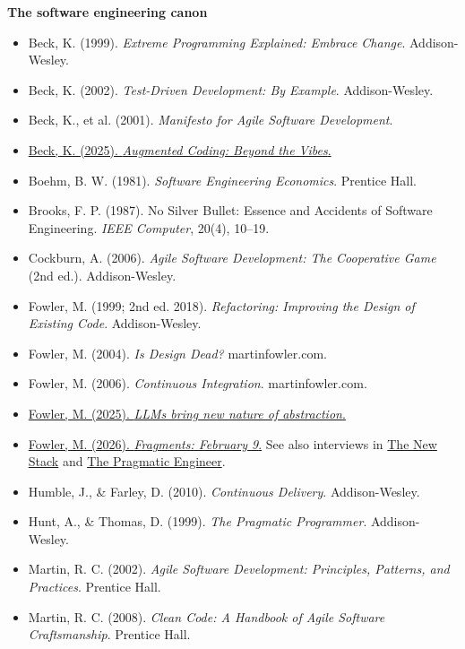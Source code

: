 \documentclass[11pt]{article}
\begin{document}
\textbf{The software engineering canon}
\begin{itemize}[leftmargin=*]
  \item Beck, K. (1999). \emph{Extreme Programming Explained: Embrace Change}. Addison-Wesley.
  \item Beck, K. (2002). \emph{Test-Driven Development: By Example}. Addison-Wesley.
  \item Beck, K., et al. (2001). \emph{Manifesto for Agile Software Development}.
  \item \href{https://newsletter.kentbeck.com/p/augmented-coding-beyond-the-vibes}{Beck, K. (2025). \emph{Augmented Coding: Beyond the Vibes}.}
  \item Boehm, B. W. (1981). \emph{Software Engineering Economics}. Prentice Hall.
  \item Brooks, F. P. (1987). No Silver Bullet: Essence and Accidents of Software Engineering. \emph{IEEE Computer}, 20(4), 10--19.
  \item Cockburn, A. (2006). \emph{Agile Software Development: The Cooperative Game} (2nd ed.). Addison-Wesley.
  \item Fowler, M. (1999; 2nd ed. 2018). \emph{Refactoring: Improving the Design of Existing Code}. Addison-Wesley.
  \item Fowler, M. (2004). \emph{Is Design Dead?} martinfowler.com.
  \item Fowler, M. (2006). \emph{Continuous Integration}. martinfowler.com.
  \item \href{https://martinfowler.com/articles/2025-nature-abstraction.html}{Fowler, M. (2025). \emph{LLMs bring new nature of abstraction}.}
  \item \href{https://www.martinfowler.com/fragments/2026-02-09.html}{Fowler, M. (2026). \emph{Fragments: February 9}.} See also interviews in \href{https://thenewstack.io/martin-fowler-on-preparing-for-ais-nondeterministic-computing/}{The New Stack} and \href{https://newsletter.pragmaticengineer.com/p/martin-fowler}{The Pragmatic Engineer}.
  \item Humble, J., \& Farley, D. (2010). \emph{Continuous Delivery}. Addison-Wesley.
  \item Hunt, A., \& Thomas, D. (1999). \emph{The Pragmatic Programmer}. Addison-Wesley.
  \item Martin, R. C. (2002). \emph{Agile Software Development: Principles, Patterns, and Practices}. Prentice Hall.
  \item Martin, R. C. (2008). \emph{Clean Code: A Handbook of Agile Software Craftsmanship}. Prentice Hall.

\end{itemize}
\end{document}

